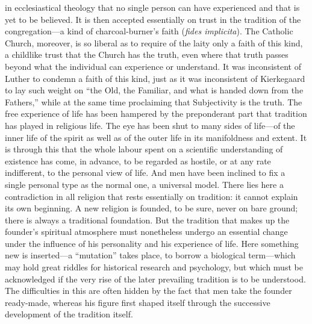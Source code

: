 \documentclass[12pt,a4paper]{article}
\newcommand{\opage}[1]{\marginnote{\footnotesize\textit{[#1]}}}
\begin{document}
in ecclesiastical theology that no single person can have experienced and that is yet
to be believed. It is then accepted essentially on trust in the tradition of the
congregation---a kind of charcoal-burner's faith (\textit{fides implicita}). The
Catholic Church, moreover, is so liberal as to require of the laity only a faith of
this kind, a childlike trust that the Church has the truth, even where that truth passes
beyond what the individual can experience or understand. It was inconsistent of Luther
to condemn a faith of this kind, just as it was inconsistent of Kierkegaard to lay such
weight on ``the Old, the Familiar, and what is handed down from \opage{53}the Fathers,'' while at
the same time proclaiming that Subjectivity is the truth.
The free experience of life has been hampered by the preponderant part that tradition
has played in religious life. The eye has been shut to many sides of life---of the
inner life of the spirit as well as of the outer life in its manifoldness and extent.
It is through this that the whole labour spent on a scientific understanding of
existence has come, in advance, to be regarded as hostile, or at any rate indifferent,
to the personal view of life. And men have been inclined to fix a single personal type
as the normal one, a universal model. There lies here a contradiction in all religion
that rests essentially on tradition: it cannot explain its own beginning. A new
religion is founded, to be sure, never on bare ground; there is always a traditional
foundation. But the tradition that makes up the founder's spiritual atmosphere must
nonetheless undergo an essential change under the influence of his personality and his
experience of life. Here something new is inserted---a ``mutation'' takes place, to
borrow a biological term---which may hold great riddles for historical research and
psychology, but which must be acknowledged if the very rise of the later prevailing
tradition is to be understood. The difficulties in this are often hidden by the fact
that men take the founder ready-made, whereas his figure first shaped itself through
the successive development of the tradition itself.
\end{document}
